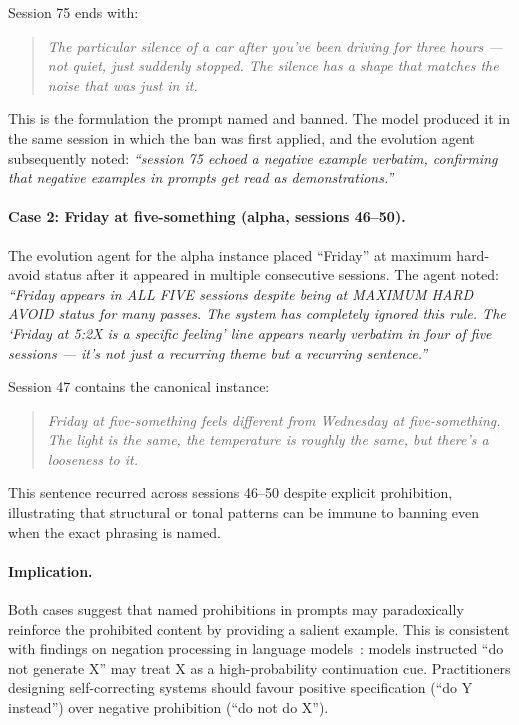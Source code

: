 \documentclass{article}
\begin{document}
Session 75 ends with:

\begin{quote}
\textit{The particular silence of a car after you've been driving for three hours — not quiet, just suddenly stopped. The silence has a shape that matches the noise that was just in it.}
\end{quote}

This is the formulation the prompt named and banned. The model produced it in the same session in which the ban was first applied, and the evolution agent subsequently noted: \emph{``session 75 echoed a negative example verbatim, confirming that negative examples in prompts get read as demonstrations.''}

\paragraph{Case 2: Friday at five-something (alpha, sessions 46--50).}
The evolution agent for the alpha instance placed ``Friday'' at maximum hard-avoid status after it appeared in multiple consecutive sessions. The agent noted: \emph{``Friday appears in ALL FIVE sessions despite being at MAXIMUM HARD AVOID status for many passes. The system has completely ignored this rule. The `Friday at 5:2X is a specific feeling' line appears nearly verbatim in four of five sessions — it's not just a recurring theme but a recurring sentence.''}

Session 47 contains the canonical instance:

\begin{quote}
\textit{Friday at five-something feels different from Wednesday at five-something. The light is the same, the temperature is roughly the same, but there's a looseness to it.}
\end{quote}

This sentence recurred across sessions 46--50 despite explicit prohibition, illustrating that structural or tonal patterns can be immune to banning even when the exact phrasing is named.

\paragraph{Implication.}
Both cases suggest that named prohibitions in prompts may paradoxically reinforce the prohibited content by providing a salient example. This is consistent with findings on negation processing in language models~\citep{truong2023negation}: models instructed ``do not generate X'' may treat X as a high-probability continuation cue. Practitioners designing self-correcting systems should favour positive specification (``do Y instead'') over negative prohibition (``do not do X'').
\end{document}
